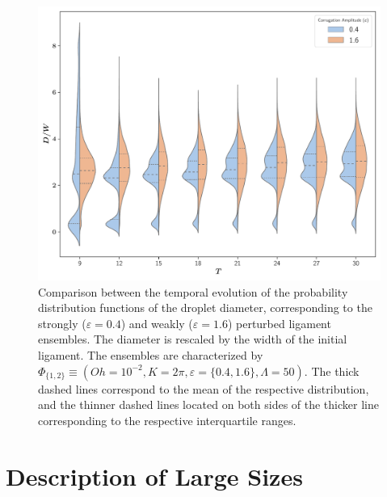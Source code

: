 

\begin{figure}
\centering
\includegraphics{plots/drop_stats/amp_dist_compare.pdf}
\caption{Comparison between the temporal evolution of the probability distribution functions of the
	droplet diameter, corresponding to the strongly ($\varepsilon = 0.4$) and 
	weakly ($\varepsilon = 1.6$) perturbed ligament ensembles. 
	The diameter is rescaled by the width of the initial ligament. 
	The ensembles are characterized by $\Phi_{\{1,2\}} \equiv \left( Oh = 10^{-2}, K = 2\pi 
, \varepsilon = \{0.4,1.6 \} , \Lambda = 50 \right)$. 
The thick dashed lines correspond to the mean of the respective distribution, and the thinner
dashed lines located on both sides of the thicker line corresponding to the respective interquartile ranges. 
	}
\label{tseries_comp}
\end{figure}


\section{Description of Large Sizes}

